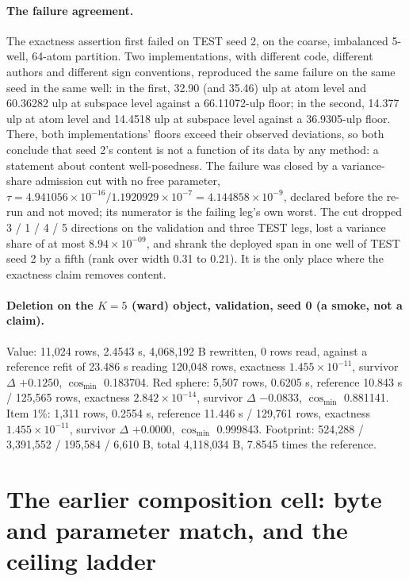 \documentclass{article} %
\newcommand{\sci}[2]{\ensuremath{#1\times10^{#2}}}
\begin{document}
\paragraph{The failure agreement.} The exactness assertion first failed on TEST seed 2, on the
coarse, imbalanced 5-well, 64-atom partition. Two implementations, with different code, different
authors and different sign conventions, reproduced the same failure on the same seed in the same
well: in the first, 32.90 (and 35.46) ulp at atom level and 60.36282 ulp at subspace level against
a 66.11072-ulp floor; in the second, 14.377 ulp at atom level and 14.4518 ulp at subspace level
against a 36.9305-ulp floor. There, both implementations' floors exceed their observed deviations,
so both conclude that seed 2's content is not a function of its data by any method: a statement
about content well-posedness. The failure was closed by a variance-share admission cut with no
free parameter, $\tau=4.941056\times10^{-16}/1.1920929\times10^{-7}=4.144858\times10^{-9}$,
declared before the re-run and not moved; its numerator is the failing leg's own worst.
The cut dropped 3 / 1 / 4 / 5 directions on the validation and three TEST legs, lost a variance
share of at most \sci{8.94}{-09}, and shrank the deployed span in one well of TEST seed 2 by a
fifth (rank over width 0.31 to 0.21). It is the only place where the exactness claim removes content.

\paragraph{Deletion on the $K=5$ (ward) object, validation, seed 0 (a smoke, not a claim).} Value:
11,024 rows, 2.4543 s, 4,068,192 B rewritten, 0 rows read, against a reference refit of 23.486 s
reading 120,048 rows, exactness \sci{1.455}{-11}, survivor $\Delta$ $+0.1250$, $\cos_{\min}$
0.183704. Red sphere: 5,507 rows, 0.6205 s, reference 10.843 s / 125,565 rows, exactness
\sci{2.842}{-14}, survivor $\Delta$ $-0.0833$, $\cos_{\min}$ 0.881141. Item 1\%: 1,311 rows,
0.2554 s, reference 11.446 s / 129,761 rows, exactness \sci{1.455}{-11}, survivor $\Delta$
$+0.0000$, $\cos_{\min}$ 0.999843. Footprint: 524,288 / 3,391,552 / 195,584 / 6,610 B, total
4,118,034 B, 7.8545 times the reference. %

\section{The earlier composition cell: byte and parameter match, and the ceiling ladder}
\label{app:w5}
\end{document}
